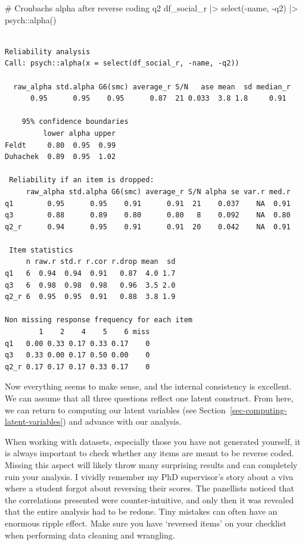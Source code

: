 \documentclass[
  letterpaper,
  DIV=11,
  numbers=noendperiod]{scrreprt}
\newenvironment{Shaded}{\begin{snugshade}}{\end{snugshade}}
\newcommand{\CommentTok}[1]{\textcolor[rgb]{0.37,0.37,0.37}{#1}}
\newcommand{\FunctionTok}[1]{\textcolor[rgb]{0.28,0.35,0.67}{#1}}
\newcommand{\NormalTok}[1]{\textcolor[rgb]{0.00,0.23,0.31}{#1}}
\newcommand{\SpecialCharTok}[1]{\textcolor[rgb]{0.37,0.37,0.37}{#1}}
\begin{document}
\begin{Shaded}
\begin{Highlighting}[]
\CommentTok{\# Cronbach\textquotesingle{}s alpha after reverse coding q2}
\NormalTok{df\_social\_r }\SpecialCharTok{|\textgreater{}}
  \FunctionTok{select}\NormalTok{(}\SpecialCharTok{{-}}\NormalTok{name, }\SpecialCharTok{{-}}\NormalTok{q2) }\SpecialCharTok{|\textgreater{}}
\NormalTok{  psych}\SpecialCharTok{::}\FunctionTok{alpha}\NormalTok{()}
\end{Highlighting}
\end{Shaded}

\begin{verbatim}

Reliability analysis   
Call: psych::alpha(x = select(df_social_r, -name, -q2))

  raw_alpha std.alpha G6(smc) average_r S/N   ase mean  sd median_r
      0.95      0.95    0.95      0.87  21 0.033  3.8 1.8     0.91

    95% confidence boundaries 
         lower alpha upper
Feldt     0.80  0.95  0.99
Duhachek  0.89  0.95  1.02

 Reliability if an item is dropped:
     raw_alpha std.alpha G6(smc) average_r S/N alpha se var.r med.r
q1        0.95      0.95    0.91      0.91  21    0.037    NA  0.91
q3        0.88      0.89    0.80      0.80   8    0.092    NA  0.80
q2_r      0.94      0.95    0.91      0.91  20    0.042    NA  0.91

 Item statistics 
     n raw.r std.r r.cor r.drop mean  sd
q1   6  0.94  0.94  0.91   0.87  4.0 1.7
q3   6  0.98  0.98  0.98   0.96  3.5 2.0
q2_r 6  0.95  0.95  0.91   0.88  3.8 1.9

Non missing response frequency for each item
        1    2    4    5    6 miss
q1   0.00 0.33 0.17 0.33 0.17    0
q3   0.33 0.00 0.17 0.50 0.00    0
q2_r 0.17 0.17 0.17 0.33 0.17    0
\end{verbatim}

Now everything seems to make sense, and the internal consistency is
excellent. We can assume that all three questions reflect one latent
construct. From here, we can return to computing our latent variables
(see Section~\ref{sec-computing-latent-variables}) and advance with our
analysis.

When working with datasets, especially those you have not generated
yourself, it is always important to check whether any items are meant to
be reverse coded. Missing this aspect will likely throw many surprising
results and can completely ruin your analysis. I vividly remember my PhD
supervisor's story about a viva where a student forgot about reversing
their scores. The panellists noticed that the correlations presented
were counter-intuitive, and only then it was revealed that the entire
analysis had to be redone. Tiny mistakes can often have an enormous
ripple effect. Make sure you have `reversed items' on your checklist
when performing data cleaning and wrangling.
\end{document}
